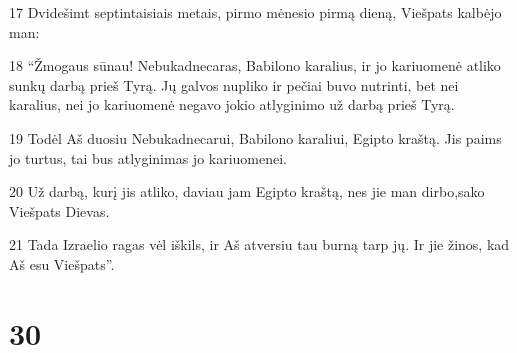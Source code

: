 \par 17 Dvidešimt septintaisiais metais, pirmo mėnesio pirmą dieną, Viešpats kalbėjo man: 
\par 18 “Žmogaus sūnau! Nebukadnecaras, Babilono karalius, ir jo kariuomenė atliko sunkų darbą prieš Tyrą. Jų galvos nupliko ir pečiai buvo nutrinti, bet nei karalius, nei jo kariuomenė negavo jokio atlyginimo už darbą prieš Tyrą. 
\par 19 Todėl Aš duosiu Nebukadnecarui, Babilono karaliui, Egipto kraštą. Jis paims jo turtus, tai bus atlyginimas jo kariuomenei. 
\par 20 Už darbą, kurį jis atliko, daviau jam Egipto kraštą, nes jie man dirbo,­sako Viešpats Dievas.­ 
\par 21 Tada Izraelio ragas vėl iškils, ir Aš atversiu tau burną tarp jų. Ir jie žinos, kad Aš esu Viešpats”.



\chapter{30}


